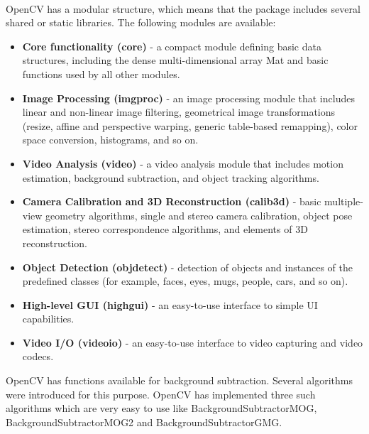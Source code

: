 \documentclass[11pt]{report}
\begin{document}
\begin{itemize}
    \\OpenCV has a modular structure, which means that the package includes several shared or static libraries. The following modules are available:
    \begin{itemize}
        \item \textbf{Core functionality (core)} - a compact module defining basic data structures, including the dense multi-dimensional array Mat and basic functions used by all other modules.
        \item \textbf{Image Processing (imgproc)} - an image processing module that includes linear and non-linear image filtering, geometrical image transformations (resize, affine and perspective warping, generic table-based remapping), color space conversion, histograms, and so on.
        \item \textbf{Video Analysis (video)} - a video analysis module that includes motion estimation, background subtraction, and object tracking algorithms.
        \item \textbf{Camera Calibration and 3D Reconstruction (calib3d)} - basic multiple-view geometry algorithms, single and stereo camera calibration, object pose estimation, stereo correspondence algorithms, and elements of 3D reconstruction.
        \item \textbf{Object Detection (objdetect)} - detection of objects and instances of the predefined classes (for example, faces, eyes, mugs, people, cars, and so on).
        \item \textbf{High-level GUI (highgui)} - an easy-to-use interface to simple UI capabilities.
        \item \textbf{Video I/O (videoio)} - an easy-to-use interface to video capturing and video codecs.
    \end{itemize}


    OpenCV has functions available for background subtraction. Several algorithms were introduced for this purpose. OpenCV has implemented three such algorithms which are very easy to use like BackgroundSubtractorMOG, BackgroundSubtractorMOG2 and BackgroundSubtractorGMG.
    

\end{itemize}
\end{document}
